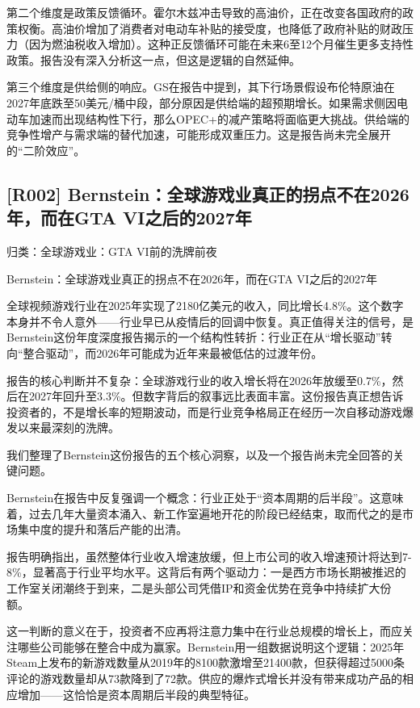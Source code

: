 \documentclass[11pt]{ctexart}
\begin{document}
第二个维度是政策反馈循环。霍尔木兹冲击导致的高油价，正在改变各国政府的政策权衡。高油价增加了消费者对电动车补贴的接受度，也降低了政府补贴的财政压力（因为燃油税收入增加）。这种正反馈循环可能在未来6至12个月催生更多支持性政策。报告没有深入分析这一点，但这是逻辑的自然延伸。

第三个维度是供给侧的响应。GS在报告中提到，其下行场景假设布伦特原油在2027年底跌至50美元/桶中段，部分原因是供给端的超预期增长。如果需求侧因电动车加速而出现结构性下行，那么OPEC+的减产策略将面临更大挑战。供给端的竞争性增产与需求端的替代加速，可能形成双重压力。这是报告尚未完全展开的“二阶效应”。

\subsection{[R002] Bernstein：全球游戏业真正的拐点不在2026年，而在GTA VI之后的2027年}
{\small\color{refgray}归类：全球游戏业：GTA VI前的洗牌前夜}

Bernstein：全球游戏业真正的拐点不在2026年，而在GTA VI之后的2027年

全球视频游戏行业在2025年实现了2180亿美元的收入，同比增长4.8\%。这个数字本身并不令人意外——行业早已从疫情后的回调中恢复。真正值得关注的信号，是Bernstein这份年度深度报告揭示的一个结构性转折：行业正在从“增长驱动”转向“整合驱动”，而2026年可能成为近年来最被低估的过渡年份。

报告的核心判断并不复杂：全球游戏行业的收入增长将在2026年放缓至0.7\%，然后在2027年回升至3.3\%。但数字背后的叙事远比表面丰富。这份报告真正想告诉投资者的，不是增长率的短期波动，而是行业竞争格局正在经历一次自移动游戏爆发以来最深刻的洗牌。

我们整理了Bernstein这份报告的五个核心洞察，以及一个报告尚未完全回答的关键问题。

Bernstein在报告中反复强调一个概念：行业正处于“资本周期的后半段”。这意味着，过去几年大量资本涌入、新工作室遍地开花的阶段已经结束，取而代之的是市场集中度的提升和落后产能的出清。

报告明确指出，虽然整体行业收入增速放缓，但上市公司的收入增速预计将达到7-8\%，显著高于行业平均水平。这背后有两个驱动力：一是西方市场长期被推迟的工作室关闭潮终于到来，二是头部公司凭借IP和资金优势在竞争中持续扩大份额。

这一判断的意义在于，投资者不应再将注意力集中在行业总规模的增长上，而应关注哪些公司能够在整合中成为赢家。Bernstein用一组数据说明这个逻辑：2025年Steam上发布的新游戏数量从2019年的8100款激增至21400款，但获得超过5000条评论的游戏数量却从73款降到了72款。供应的爆炸式增长并没有带来成功产品的相应增加——这恰恰是资本周期后半段的典型特征。
\end{document}
